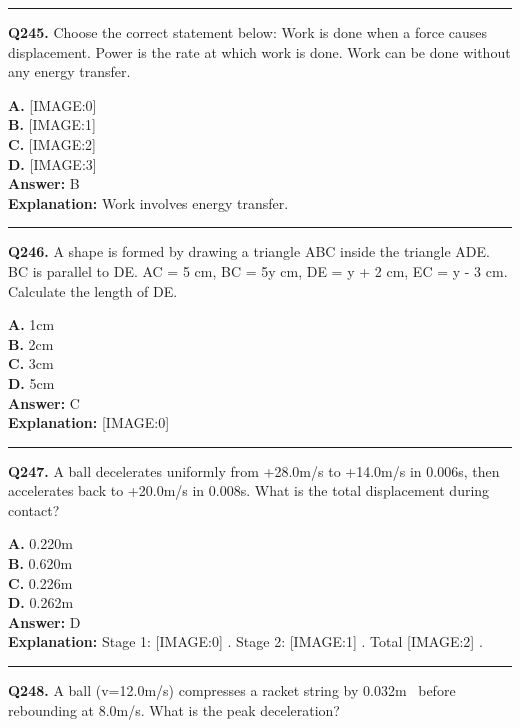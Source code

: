 \documentclass[12pt]{article}
\begin{document}
\hrule
\vspace{1em}


\noindent
\textbf{Q245.} Choose the correct statement below:
Work is done when a force causes displacement.
Power is the rate at which work is done.
Work can be done without any energy transfer.



\textbf{A.} [IMAGE:0] \\
\textbf{B.} [IMAGE:1] \\
\textbf{C.} [IMAGE:2] \\
\textbf{D.} [IMAGE:3] \\

\textbf{Answer:} B \\
\textbf{Explanation:} Work involves energy transfer.

\hrule
\vspace{1em}


\noindent
\textbf{Q246.} A shape is formed by drawing a triangle ABC inside the triangle ADE. BC is parallel to DE. AC = 5 cm, BC = 5y cm, DE = y + 2 cm, EC = y - 3 cm.
Calculate the length of DE.



\textbf{A.} 1cm \\
\textbf{B.} 2cm \\
\textbf{C.} 3cm \\
\textbf{D.} 5cm \\

\textbf{Answer:} C \\
\textbf{Explanation:} [IMAGE:0]

\hrule
\vspace{1em}


\noindent
\textbf{Q247.} A ball decelerates uniformly from +28.0m/s to +14.0m/s in 0.006s, then accelerates back to +20.0m/s in 0.008s.
What is the total displacement during contact?



\textbf{A.} 0.220m \\
\textbf{B.} 0.620m \\
\textbf{C.} 0.226m \\
\textbf{D.} 0.262m \\

\textbf{Answer:} D \\
\textbf{Explanation:} Stage 1:
[IMAGE:0]
. Stage 2:
[IMAGE:1]
. Total
[IMAGE:2]
.

\hrule
\vspace{1em}


\noindent
\textbf{Q248.} A ball (v=12.0m/s) compresses a racket string by 0.032m  before rebounding at 8.0m/s.
What is the peak deceleration?
\end{document}
